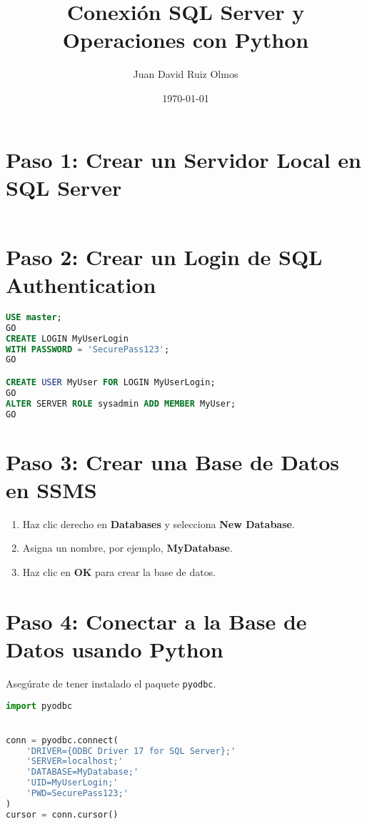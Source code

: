 \documentclass{article}
\title{Conexión SQL Server y Operaciones con Python}
\author{Juan David Ruiz Olmos}
\date{\today}
\begin{document}
\maketitle

\section{Paso 1: Crear un Servidor Local en SQL Server}
\begin{lstlisting}[language=SQL, caption=Crea un servidor local en SSMS]

\end{lstlisting}

\section{Paso 2: Crear un Login de SQL Authentication}
\begin{lstlisting}[language=SQL, caption=Crear un login SQL Authentication]
USE master;
GO
CREATE LOGIN MyUserLogin 
WITH PASSWORD = 'SecurePass123';
GO

CREATE USER MyUser FOR LOGIN MyUserLogin;
GO
ALTER SERVER ROLE sysadmin ADD MEMBER MyUser;
GO
\end{lstlisting}

\section{Paso 3: Crear una Base de Datos en SSMS}
\begin{enumerate}
    \item Haz clic derecho en \textbf{Databases} y selecciona \textbf{New Database}.
    \item Asigna un nombre, por ejemplo, \textbf{MyDatabase}.
    \item Haz clic en \textbf{OK} para crear la base de datos.
\end{enumerate}

\section{Paso 4: Conectar a la Base de Datos usando Python}
Asegúrate de tener instalado el paquete \texttt{pyodbc}.
\begin{lstlisting}[language=Python, caption=Código para conectarse a SQL Server]
import pyodbc


conn = pyodbc.connect(
    'DRIVER={ODBC Driver 17 for SQL Server};'
    'SERVER=localhost;'
    'DATABASE=MyDatabase;'
    'UID=MyUserLogin;'
    'PWD=SecurePass123;'
)
cursor = conn.cursor()
\end{lstlisting}
\end{document}
